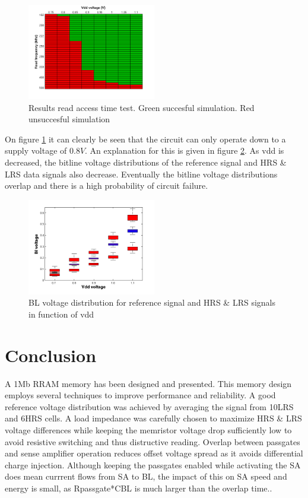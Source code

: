 \documentclass[journal]{IEEEtran}
\begin{document}
\begin{figure}[h!t]
  \centering
  \includegraphics[width=0.5\textwidth]{../fig/hfdst-final-vddspeed.png}
  \caption{Results read access time test. Green succesful simulation. Red unsuccesful simulation}
  \label{fig:speedvdd}
\end{figure}

On figure \ref{fig:speedvdd} it can clearly be seen that the circuit can only operate down to a supply voltage of $0.8V$. An explanation for this is given in figure \ref{fig:vblvdd}. As vdd is decreased, the bitline voltage distributions of the reference signal and HRS \& LRS data signals also decrease. Eventually the bitline voltage distributions overlap and there is a high probability of circuit failure.

\begin{figure}[h!t]
  \centering
  \includegraphics[width=0.5\textwidth]{../fig/hfdst-final-vddbl.png}
  \caption{BL voltage distribution for reference signal and HRS \& LRS signals in function of vdd}
  \label{fig:vblvdd}
\end{figure}




\section{Conclusion}
A 1Mb RRAM memory has been designed and presented. This memory design employs several techniques to improve performance and reliability. A good reference voltage distribution was achieved by averaging the signal from 10LRS and 6HRS cells. A load impedance was carefully chosen to maximize HRS \& LRS voltage differences while keeping the memristor voltage drop sufficiently low to avoid resistive switching and thus distructive reading. Overlap between passgates and sense amplifier operation reduces offset voltage spread as it avoids differential charge injection. Although keeping the passgates enabled while activating the SA does mean currrent flows from SA to BL, the impact of this on SA speed and energy is small, as Rpassgate*CBL is much larger than the overlap time..


{}

\end{document}
